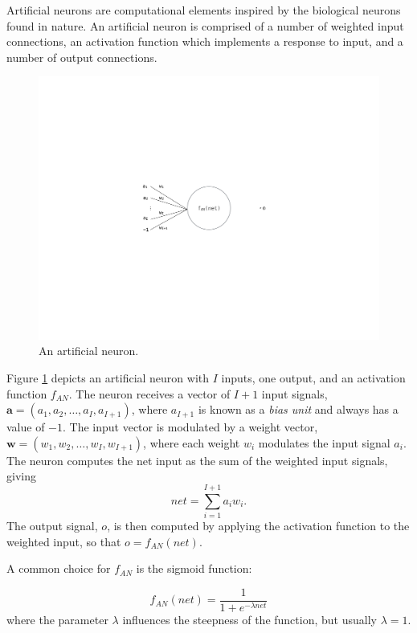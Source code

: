 \documentclass[master]{outhesis}
\begin{document}
Artificial neurons are computational elements inspired by the biological neurons found in nature.
An artificial neuron is comprised of a number of weighted input connections, an activation function which implements a response to input, and a number of output connections.

\begin{figure}[H]
	\centering
	\includegraphics{ArtificialNeuron.pdf}
	\caption{An artificial neuron.}
	\label{fig:neuron}
\end{figure}

Figure \ref{fig:neuron} depicts an artificial neuron with $I$ inputs, one output, and an activation function $f_{AN}$. The neuron receives a vector of $I+1$ input signals, $\mathbf{a}=(a_1, a_2, \ldots, a_I, a_{I+1})$, where $a_{I+1}$ is known as a \emph{bias unit} and always has a value of $-1$.  The input vector is modulated by a weight vector, $\mathbf{w}=(w_1, w_2, \ldots, w_I, w_{I+1})$, where each weight $w_i$ modulates the input signal $a_i$. The neuron computes the net input as the sum of the weighted input signals, giving
\begin{displaymath}
net=\sum_{i=1}^{I+1}a_iw_i.
\end{displaymath}
The output signal, $o$, is then computed by applying the activation function to the weighted input, so that $o=f_{AN}(net)$.

A common choice for $f_{AN}$ is the sigmoid function:

\begin{displaymath}
f_{AN}(net) = \frac{1}{1 + e^{-\lambda net}}
\end{displaymath}
where the parameter $\lambda$ influences the steepness of the function, but usually $\lambda = 1$.
\end{document}
